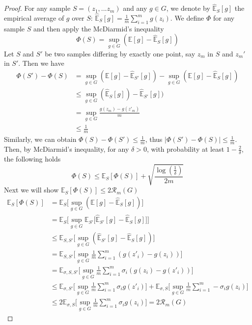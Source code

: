 \begin{proof}
	For any sample $S=(z_1,...z_m)$ and any $g\in G$, we denote by $\hat{\mathbb{E}}_S[g]$ the empirical average of $g$ over $S$: $\hat{\mathbb{E}}_S[g]= \frac{1}{m} \sum_{i=1}^{m}g(z_i)$. We define $\Phi$ for any sample $S$ and then apply the McDiarmid's inequality
	\begin{equation}
	\Phi(S)= \sup_{g\in G}(\mathbb{E}[g]-\hat{\mathbb{E}}_S[g])
	\end{equation}
	Let $S$ and $S'$ be two samples differing by exactly one point, say $z_m$ in $S$ and $z_m'$ in $S'$. Then we have
	\begin{align}
	\Phi(S')-\Phi(S) &= \sup_{g\in G}(\mathbb{E}[g]-\hat{\mathbb{E}}_{S'}[g]) -\sup_{g\in G}(\mathbb{E}[g]-\hat{\mathbb{E}}_S[g])\\
	&\leq \sup_{g\in G}(\hat{\mathbb{E}}_S[g])-\hat{\mathbb{E}}_{S'}[g])\\
	&= \sup_{g\in G} \frac{g(z_m)-g(z'_m)}{m} \\
	&\leq \frac{1}{m}
	\end{align}
	Similarly, we can obtain $\Phi(S)-\Phi(S')\leq \frac{1}{m}$, thus $|\Phi(S')-\Phi(S)|\leq \frac{1}{m}$. Then, by McDiarmid's inequality, for any $\delta>0$, with probability at least $1-\frac{2}{\delta}$, the following holds
	\begin{equation}
	\Phi(S)\leq \mathbb{E}_S[\Phi(S)]+ \sqrt{\frac{\log(\frac{1}{\delta})}{2m}}
	\end{equation}
	Next we will show $\mathbb{E}_S[\Phi(S)] \leq 2\mathcal{R}_m(G)$
	\begin{align}
	\mathbb{E}_S[\Phi(S)]&= \mathbb{E}_S\bigg[\sup_{g\in G}(\mathbb{E}[g]-\hat{\mathbb{E}}_S[g])\bigg]\\
	&=\mathbb{E}_S\bigg[\sup_{g\in G}\mathbb{E}_{S'}\big[\hat{\mathbb{E}}_{S'}[g]-\hat{\mathbb{E}}_S[g]\big]\bigg]\\
	&\leq \mathbb{E}_{S,S'}\bigg[\sup_{g\in G}(\hat{\mathbb{E}}_{S'}[g]-\hat{\mathbb{E}}_S[g])\bigg]\\
	&= \mathbb{E}_{S,S'}\bigg[\sup_{g\in G}\frac{1}{m}\sum_{i=1}^{m}(g(z'_i)-g(z_i))\bigg]\\
	&= \mathbb{E}_{\sigma,S,S'}\bigg[\sup_{g\in G}\frac{1}{m}\sum_{i=1}^{m}\sigma_i(g(z_i)-g(z'_i))\bigg]\\
	&\leq  \mathbb{E}_{\sigma,S'}\bigg[\sup_{g\in G}\frac{1}{m}\sum_{i=1}^{m}\sigma_ig(z'_i)\bigg] + \mathbb{E}_{\sigma,S}\bigg[\sup_{g\in G}\frac{1}{m}\sum_{i=1}^{m}-\sigma_ig(z_i)\bigg]\\
	&\leq 2\mathbb{E}_{\sigma,S}\bigg[\sup_{g\in G}\frac{1}{m}\sum_{i=1}^{m}\sigma_ig(z_i)\bigg] = 2\mathcal{R}_m(G)

\end{align}
\end{proof}
